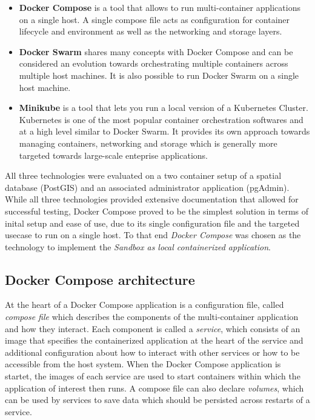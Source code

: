\documentclass[11pt, a4paper, oneside, parskip=full-]{scrartcl}
\begin{document}
\begin{itemize}
  \item \textbf{Docker Compose}\cite{dockercompose} is a tool that allows to run
  multi-container applications on a single host. A single compose file acts as
  configuration for container lifecycle and environment as well as the
  networking and storage layers.
  \item \textbf{Docker Swarm}\cite{dockerswarm} shares many concepts with Docker
  Compose and can be considered an evolution towards orchestrating multiple
  containers across multiple host machines. It is also possible to run Docker
  Swarm on a single host machine.
  \item \textbf{Minikube}\cite{minikube} is a tool that lets you run a local
  version of a Kubernetes Cluster. Kubernetes is one of the most popular
  container orchestration softwares and at a high level similar to Docker Swarm.
  It provides its own approach towards managing containers, networking and
  storage which is generally more targeted towards large-scale enteprise
  applications.
\end{itemize}

All three technologies were evaluated on a two container setup of a spatial
database (PostGIS) and an associated administrator application (pgAdmin). While
all three technologies provided extensive documentation that allowed for
successful testing, Docker Compose proved to be the simplest solution in terms
of inital setup and ease of use, due to its single configuration file and the
targeted usecase to run on a single host. To that end \emph{Docker Compose} was
chosen as the technology to implement the \emph{Sandbox as local containerized
application}.


\subsection{Docker Compose architecture}

At the heart of a Docker Compose application is a configuration file, called
\emph{compose file} which describes the components of the multi-container
application and how they interact. Each component is called a \emph{service},
which consists of an image that specifies the containerized application at the
heart of the service and additional configuration about how to interact with
other services or how to be accessible from the host system. When the Docker
Compose application is startet, the images of each service are used to start
containers within which the application of interest then runs. A compose file
can also declare \emph{volumes}, which can be used by services to save data
which should be persisted across restarts of a service.
\end{document}
